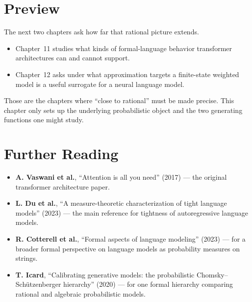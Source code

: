 \section*{Preview}

The next two chapters ask how far that rational picture extends.

\begin{itemize}
  \item Chapter~11 studies what kinds of formal-language behavior transformer architectures can and cannot support.
  \item Chapter~12 asks under what approximation targets a finite-state weighted model is a useful surrogate for a neural language model.
\end{itemize}

Those are the chapters where ``close to rational'' must be made precise. This chapter only sets up the underlying probabilistic object and the two generating functions one might study.

\section*{Further Reading}

\begin{itemize}
  \item \textbf{A. Vaswani et al.}, ``Attention is all you need'' (2017) \cite{VaswaniEtAl2017} --- the original transformer architecture paper.
  \item \textbf{L. Du et al.}, ``A measure-theoretic characterization of tight language models'' (2023) \cite{DuEtAl2023} --- the main reference for tightness of autoregressive language models.
  \item \textbf{R. Cotterell et al.}, ``Formal aspects of language modeling'' (2023) \cite{CotterellEtAl2023} --- for a broader formal perspective on language models as probability measures on strings.
  \item \textbf{T. Icard}, ``Calibrating generative models: the probabilistic Chomsky--Schützenberger hierarchy'' (2020) \cite{Icard2020} --- for one formal hierarchy comparing rational and algebraic probabilistic models.
\end{itemize}
